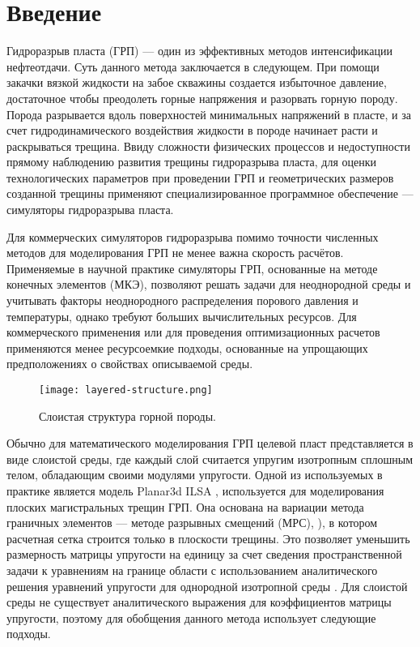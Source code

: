 \chapter*{Введение}                         %

Гидроразрыв пласта (ГРП) — один из эффективных методов интенсификации нефтеотдачи. Суть данного метода заключается в следующем. При помощи закачки вязкой жидкости на забое скважины создается избыточное давление, достаточное чтобы преодолеть горные напряжения и разорвать горную породу. Порода разрывается вдоль поверхностей минимальных напряжений в пласте, и за счет гидродинамического воздействия жидкости в породе начинает расти и раскрываться трещина. Ввиду сложности физических процессов и недоступности прямому наблюдению развития трещины гидроразрыва пласта, для оценки технологических параметров при проведении ГРП и геометрических размеров созданной трещины применяют специализированное программное обеспечение — симуляторы гидроразрыва пласта.

Для коммерческих симуляторов гидроразрыва помимо точности численных методов для моделирования ГРП не менее важна скорость расчётов. Применяемые в научной практике симуляторы ГРП, основанные на методе конечных элементов (МКЭ), позволяют решать задачи для неоднородной среды и учитывать факторы неоднородного распределения порового давления и температуры, однако требуют больших вычислительных ресурсов. Для коммерческого применения или для проведения оптимизационных расчетов применяются менее ресурсоемкие подходы, основанные на упрощающих предположениях о свойствах описываемой среды.

\begin{figure}[htbp]
    \centering
    \texttt{[image: layered-structure.png]}
    \caption{Слоистая структура горной породы.}
\end{figure}

Обычно для математического моделирования ГРП целевой пласт представляется в виде слоистой среды, где каждый слой считается упругим изотропным сплошным телом, обладающим своими модулями упругости. Одной из используемых в практике является модель Planar3d ILSA \cite{DONTSOV201753}, используется для моделирования плоских магистральных трещин ГРП. Она основана на вариации метода граничных элементов --- методе разрывных смещений (МРС), \cite{dispalecement_discontinuty_Crouch1983}), в котором расчетная сетка строится только в плоскости трещины. Это позволяет уменьшить размерность матрицы упругости на единицу за счет сведения пространственной задачи к уравнениям на границе области с использованием аналитического решения уравнений упругости для однородной изотропной среды \cite{Peir2008}. Для слоистой среды не существует аналитического выражения для коэффициентов матрицы упругости, поэтому для обобщения данного метода использует следующие подходы.

